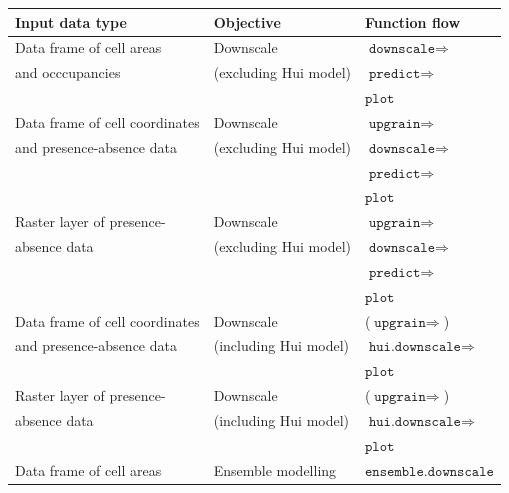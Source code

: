 \documentclass{article}[12pt, a4paper]
\begin{document}
\begin{table}[th]
\small
\centering
\begin{tabular}{| l | l | l |}
\hline
\textbf{Input data type} & \textbf{Objective} & \textbf{Function flow}
\\ \hline
Data frame of cell areas        & Downscale            & $\texttt{downscale} \Rightarrow$ \\ 
and occcupancies                & (excluding Hui model)& $\texttt{predict} \Rightarrow$ \\
                                &                      & $\texttt{plot}$ \\ \hline
Data frame of cell coordinates  & Downscale            & $\texttt{upgrain} \Rightarrow$ \\
and presence-absence data       & (excluding Hui model)& $\texttt{downscale} \Rightarrow$ \\
                                &                      & $\texttt{predict} \Rightarrow$ \\
                                &                      & $\texttt{plot}$ \\ \hline
Raster layer of presence-       & Downscale            & $\texttt{upgrain} \Rightarrow$ \\
absence data                    & (excluding Hui model)& $\texttt{downscale} \Rightarrow$ \\
                                &                      & $\texttt{predict} \Rightarrow$ \\
                                &                      & $\texttt{plot}$ \\ \hline
Data frame of cell coordinates  & Downscale            & ($\texttt{upgrain} \Rightarrow$) \\
and presence-absence data       &	(including Hui model)& $\texttt{hui.downscale} \Rightarrow$ \\
                                &                      & $\texttt{plot}$ \\ \hline
Raster layer of presence-       & Downscale            & ($\texttt{upgrain} \Rightarrow$) \\
absence data                    &	(including Hui model)& $\texttt{hui.downscale} \Rightarrow$ \\
                                &                      & $\texttt{plot}$ \\ \hline
Data frame of cell areas        & Ensemble modelling   & $\texttt{ensemble.downscale}$ \\

\end{tabular}
\end{table}
\end{document}
